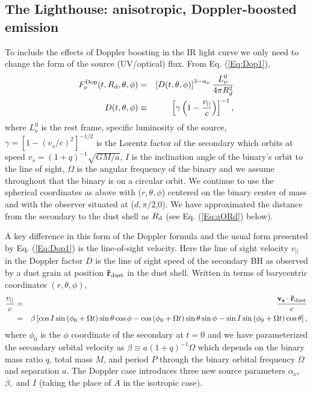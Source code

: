 \subsection{The Lighthouse: anisotropic, Doppler-boosted emission} 
To include the effects of Doppler boosting in the IR light curve we only need
to change the form of the source (UV/optical) flux. From Eq. (\ref{Eq:Dop1}),
\begin{eqnarray}
F^{\rm{Dop}}_{\nu}(t, \Rin, \theta, \phi) %
&=&  \left[D(t, \theta, \phi)\right]^{3-\alpha_{\nu}} \frac{L^0_{\nu}}{4 \pi R^2_d}  \\ \nonumber
D(t, \theta, \phi) &\equiv& \left[ \gamma \left(1 - \frac{v_{||}}{c} \right) \right]^{-1},
\label{Eq:DopFlux}
\end{eqnarray}
where $L^0_{\nu}$ is the rest frame, specific luminosity of the source,
$\gamma = \left[ 1 - (v_s/c)^2 \right]^{-1/2}$ is the Lorentz factor of the
secondary which orbits at speed $v_s = (1+q)^{-1}\sqrt{GM/a}$, $I$ is the
inclination angle of the binary's orbit to the line of sight, $\Omega$ is the
angular frequency of the binary and we assume throughout that the binary is on
a circular orbit. We continue to use the spherical coordinates as above with
($r,\theta, \phi$) centered on the binary center of mass and with the observer
situated at ($d,\pi/2$,0). We have approximated the distance from the
secondary to the dust shell as $R_{\rm{d}}$ (see Eq. (\ref{Eq:aORd}) below).

A key difference in this form of the Doppler formula and the usual form
presented by Eq. (\ref{Eq:Dop1}) is the line-of-sight velocity. Here the line of
sight velocity $v_{||}$ in the Doppler factor $D$ is the line of sight speed
of the secondary BH as observed by a dust grain at position
$\mathbf{\hat{r}}_{\rm{dust}}$ in the dust shell. Written in terms of
barycentric coordinates $(r,\theta, \phi)$,
\begin{eqnarray}
\label{Eq:vlos}
\frac{v_{||}}{c} &=& \frac{\mathbf{v_{s}} \cdot \mathbf{\hat{r}}_{\rm{dust}} }{c}\\ \nonumber 
& = & \beta  \left[ \cos{I} \sin{(\phi_0+\Omega t)} \sin{\theta}\cos{\phi} - \cos{(\phi_0+\Omega t)} \sin{\theta}\sin{\phi} - \sin{I} \sin{(\phi_0+\Omega t)} \cos{\theta}  \right],
\end{eqnarray}
where $\phi_0$ is the $\phi$ coordinate of the secondary at $t=0$ and we have
parameterized the secondary orbital velocity as $\beta \equiv a (1+q)^{-1}
\Omega$ which depends on the binary mass ratio $q$, total mass $M$, and period
$P$ through the binary orbital frequency $\Omega$ and separation $a$. The
Doppler case introduces three new source parameters $\alpha_{\nu}$, $\beta,$
and $I$ (taking the place of $A$ in the isotropic case).

